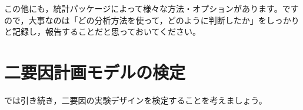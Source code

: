 \documentclass{ltjbook}
\begin{document}
この他にも，統計パッケージによって様々な方法・オプションがあります。ですので，大事なのは「どの分析方法を使って，どのように判断したか」をしっかりと記録し，報告することだと思っておいてください。




\section{二要因計画モデルの検定}
では引き続き，二要因の実験デザインを検定することを考えましょう。
\end{document}
